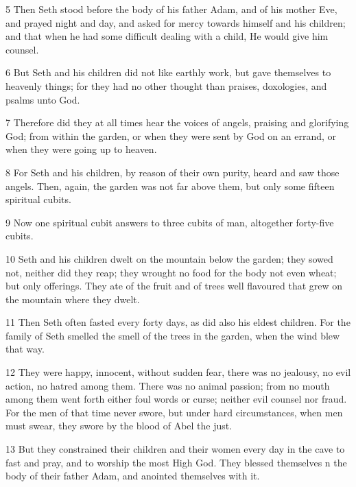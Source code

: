 \par 5 Then Seth stood before the body of his father Adam, and of his mother Eve, and prayed night and day, and asked for mercy towards himself and his children; and that when he had some difficult dealing with a child, He would give him counsel.

\par 6 But Seth and his children did not like earthly work, but gave themselves to heavenly things; for they had no other thought than praises, doxologies, and psalms unto God.

\par 7 Therefore did they at all times hear the voices of angels, praising and glorifying God; from within the garden, or when they were sent by God on an errand, or when they were going up to heaven.

\par 8 For Seth and his children, by reason of their own purity, heard and saw those angels. Then, again, the garden was not far above them, but only some fifteen spiritual cubits.

\par 9 Now one spiritual cubit answers to three cubits of man, altogether forty-five cubits.

\par 10 Seth and his children dwelt on the mountain below the garden; they sowed not, neither did they reap; they wrought no food for the body not even wheat; but only offerings. They ate of the fruit and of trees well flavoured that grew on the mountain where they dwelt.

\par 11 Then Seth often fasted every forty days, as did also his eldest children. For the family of Seth smelled the smell of the trees in the garden, when the wind blew that way.

\par 12 They were happy, innocent, without sudden fear, there was no jealousy, no evil action, no hatred among them. There was no animal passion; from no mouth among them went forth either foul words or curse; neither evil counsel nor fraud. For the men of that time never swore, but under hard circumstances, when men must swear, they swore by the blood of Abel the just.

\par 13 But they constrained their children and their women every day in the cave to fast and pray, and to worship the most High God. They blessed themselves n the body of their father Adam, and anointed themselves with it.

